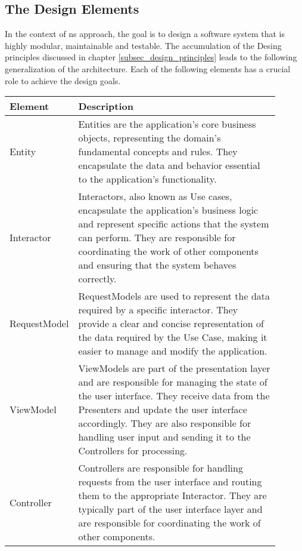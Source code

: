 \subsection{The Design Elements} \label{subsec_design_elements}

In the context of \gls{ns} approach, the goal is to design a software system that is highly
modular, maintainable and testable. The accumulation of the Desing principles discussed
in chapter \ref{subsec_design_principles} leads to the following generalization of the
architecture. Each of the following elements has a crucial role to achieve the
design goals.

\begin{table}[H]
    \begin{tabular}{ p{0.15\linewidth} p{0.75\linewidth}}
        \hline
        \textbf{Element} & \textbf{Description} \\ 
        \hline
        Entity & Entities are the application's core business objects, representing the
        domain's fundamental concepts and rules. They encapsulate the data and behavior
        essential to the application's functionality.\\ \midrule

        Interactor & Interactors, also known as Use cases, encapsulate the application's
        business logic and represent specific actions that the system can perform. They
        are responsible for coordinating the work of other components and ensuring that
        the system behaves correctly.\\ \midrule

        RequestModel & RequestModels are used to represent the data required by a specific
        interactor. They provide a clear and concise representation of the data required
        by the Use Case, making it easier to manage and modify the application.\\ \midrule

        ViewModel & ViewModels are part of the presentation layer and are responsible for
        managing the state of the user interface. They receive data from the Presenters
        and update the user interface accordingly. They are also responsible for handling
        user input and sending it to the Controllers for processing.\\ \midrule

        Controller & Controllers are responsible for handling requests from the user
        interface and routing them to the appropriate Interactor. They are typically part
        of the user interface layer and are responsible for coordinating the work of other
        components.\\ \midrule


\end{tabular}
\end{table}
